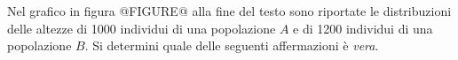 Nel grafico in figura @FIGURE@ alla fine del testo 
sono riportate le distribuzioni delle altezze di 1000 individui 
di una popolazione $A$ e di 1200 individui di una popolazione $B$. 
Si determini quale
delle seguenti affermazioni è \emph{vera}. %